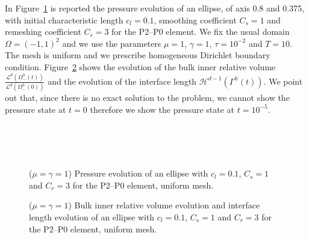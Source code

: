 \documentclass[a4paper,12pt,onecolumn]{article}
\begin{document}
In Figure~\ref{fig:ellipse_both} is reported the pressure evolution of an
ellipse, of axis 0.8 and 0.375, with initial characteristic length $c_l=0.1$,
smoothing coefficient $C_s=1$ and remeshing coefficient $C_r=3$ for the P2--P0
element. We fix the usual domain $\Omega = (-1,1)^2$ and we use the parameters
$\mu=1$, $\gamma=1$, $\tau=10^{-2}$ and $T=10$. The mesh is uniform and we
prescribe homogeneous Dirichlet boundary condition.
Figure~\ref{fig:ellipse_both_volumes} shows the evolution of the bulk inner
relative volume
$\frac{\mathcal{L}^d(\Omega^h_-(t))}{\mathcal{L}^d(\Omega^h_-(0))}$ and the
evolution of the interface length $\mathcal{H}^{d-1}(\Gamma^h(t))$. We point out
that, since there is no exact solution to the problem, we cannot show the
pressure state at $t=0$ therefore we show the pressure state at $t=10^{-5}$.
\begin{figure}[htbp]
  \centering
  \\
  \quad
  \\
  \quad
  \\
  \caption{($\mu=\gamma=1$) Pressure evolution of an ellipse with $c_l=0.1$,
$C_s=1$ and $C_r=3$ for the P2--P0 element, uniform mesh.}
  \label{fig:ellipse_both}
\end{figure}

\begin{figure}[htbp]
  \centering
  \caption{($\mu=\gamma=1$) Bulk inner relative volume evolution and interface
length evolution of an ellipse with $c_l=0.1$, $C_s=1$ and $C_r=3$ for the
P2--P0 element, uniform mesh.}
  \label{fig:ellipse_both_volumes}
\end{figure}
\end{document}
